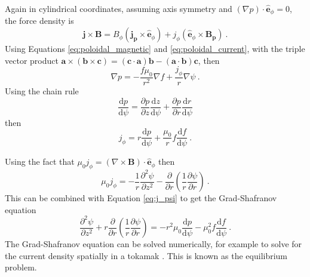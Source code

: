 \documentclass[10pt]{proc}
\newcommand{\diff}{\mathrm{d}}
\begin{document}
Again in cylindrical coordinates, assuming axis symmetry and $(\nabla p)\cdot\widehat{\mathbf{e}}_\phi=0$, the force density is
\begin{equation}
  \mathbf{j}\times\mathbf{B} =
  B_\phi\left(\mathbf{j_p}\times\widehat{\mathbf{e}}_\phi\right)
  +j_\phi\left(\widehat{\mathbf{e}}_\phi\times\mathbf{B_p}\right) \ .
\end{equation}
Using Equations \eqref{eq:poloidal_magnetic} and \eqref{eq:poloidal_current}, with the triple vector product $\mathbf{a}\times(\mathbf{b}\times\mathbf{c}) = (\mathbf{c}\cdot\mathbf{a})\mathbf{b} - (\mathbf{a}\cdot\mathbf{b})\mathbf{c}$, then
\begin{equation}
  \nabla p = -\dfrac{f\mu_0}{r^2}\nabla f+\dfrac{j_\phi}{r}\nabla \psi \ .
\end{equation}
Using the chain rule
\begin{equation}
\dfrac{\diff p}{\diff \psi} = \dfrac{\partial p}{\partial z}\dfrac{\diff z}{\diff \psi} + \dfrac{\partial p}{\partial r}\dfrac{\diff r}{\diff \psi}
\end{equation}
then
\begin{equation}
j_\phi = r\dfrac{\diff p}{\diff \psi}+\dfrac{\mu_0}{r}f\dfrac{\diff f}{\diff \psi} \ .
\label{eq:j_psi}
\end{equation}

Using the fact that $\mu_0j_\phi=\left(\nabla\times\mathbf{B}\right)\cdot\widehat{\mathbf{e}}_\phi$ then
\begin{equation}
  \mu_0j_\phi = -\dfrac{1}{r}\dfrac{\partial^2\psi}{\partial z^2}-\dfrac{\partial}{\partial r}
    \left(
      \dfrac{1}{r}\dfrac{\partial\psi}{\partial r}
    \right)
  \ .
\end{equation}
This can be combined with Equation \eqref{eq:j_psi} to get the Grad-Shafranov equation \citep{lust1957axialsymmetrische} \citep{grad1958hydromagnetic} \citep{shafranov1958magnetohydrodynamical, shafranov1966plasma}
\begin{equation}
\dfrac{\partial^2 \psi}{\partial z^2}+r\dfrac{\partial}{\partial r}\left(\dfrac{1}{r}\dfrac{\partial\psi}{\partial r}\right)
=
-r^2\mu_0\dfrac{\diff p}{\diff \psi}-\mu_0^2f\dfrac{\diff f}{\diff \psi}
\ .
\end{equation}
The Grad-Shafranov equation can be solved numerically, for example to solve for the current density spatially in a tokamak \citep{lao1985reconstruction}. This is known as the equilibrium problem.
\end{document}
